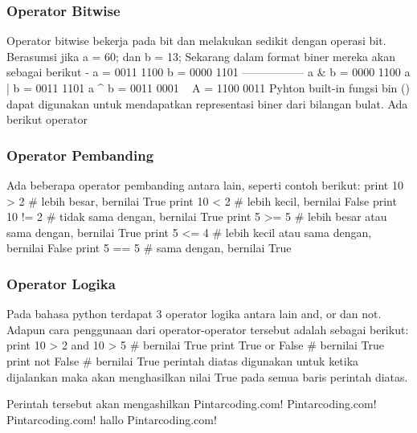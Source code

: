 \subsubsection{Operator Bitwise}
Operator bitwise bekerja pada bit dan melakukan sedikit dengan operasi bit. Berasumsi jika a = 60; dan b = 13; Sekarang dalam format biner mereka akan sebagai berikut -
a = 0011 1100
b = 0000 1101
-----------------
a & b = 0000 1100
a | b = 0011 1101
a ^ b = 0011 0001
~ A = 1100 0011
Pyhton built-in fungsi bin () dapat digunakan untuk mendapatkan representasi biner dari bilangan bulat.
Ada berikut operator 

\subsubsection{Operator Pembanding}
Ada beberapa operator pembanding antara lain, seperti contoh berikut:
print 10 > 2 # lebih besar, bernilai True
print 10 < 2 # lebih kecil, bernilai False
print 10 != 2 # tidak sama dengan, bernilai True
print 5 >= 5 # lebih besar atau sama dengan, bernilai True
print 5 <= 4 # lebih kecil atau sama dengan, bernilai False
print 5 == 5 # sama dengan, bernilai True

\subsubsection{Operator Logika}
Pada bahasa python terdapat 3 operator logika antara lain and, or dan not. Adapun cara penggunaan dari operator-operator tersebut adalah sebagai berikut:
print 10 > 2 and 10 > 5 # bernilai True
print True or False # bernilai True
print not False # bernilai True
perintah diatas digunakan untuk ketika dijalankan maka akan menghasilkan nilai True pada semua baris perintah diatas.

Perintah tersebut akan mengashilkan
Pintarcoding.com! Pintarcoding.com! Pintarcoding.com! 
hallo Pintarcoding.com!

